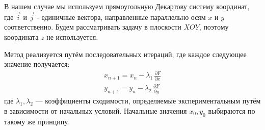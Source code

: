 \documentclass[12pt, a4paper]{article}
\begin{document}
В нашем случае мы используем прямоугольную Декартову систему координат, где $\vec i$ и $\vec j$ - единичные вектора, направленные параллельно осям $x$  и $y$ соответственно. 
Будем рассматривать задачу в плоскости $XOY$, поэтому координата  $z$ не используется.

Метод реализуется путём последовательных итераций, где каждое следующее значение получается:
\begin{gather*}
    x_{n + 1} = x_n - \lambda_1 \,\frac{\partial F}{\partial x}\\
    y_{n + 1} = y_n - \lambda_2 \,\frac{\partial F}{\partial y}
\end{gather*}
где $\lambda_1, \lambda_2$ --- коэффициенты сходимости, определяемые экспериментальным путём в зависимости от начальных условий. 
Начальные значения $x_0, y_0$ выбираются по такому же принципу.
% 
% 
\end{document}
